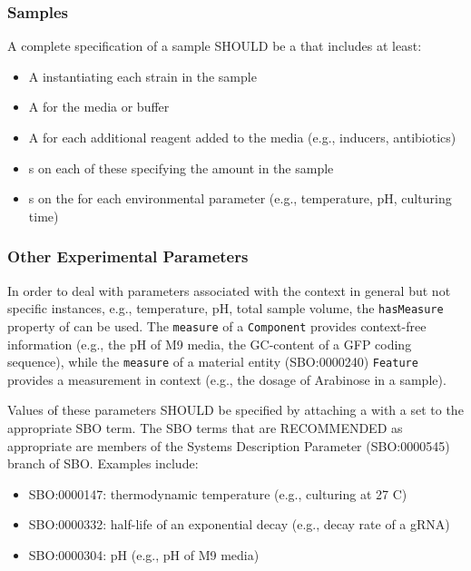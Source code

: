 \subsubsection{Samples}

A complete specification of a sample SHOULD be a  that includes at least:
\begin{itemize}
\item A  instantiating each strain in the sample
\item A  for the media or buffer
\item A  for each additional reagent added to the media (e.g., inducers, antibiotics)
\item {}s on each of these specifying the amount in the sample
\item {}s on the  for each environmental parameter (e.g., temperature, pH, culturing time)
\end{itemize}

\subsubsection{Other Experimental Parameters}

In order to deal with parameters associated with the context in general but not specific instances, e.g., temperature, pH, total sample volume, the \texttt{hasMeasure} property of  can be used.  The \texttt{measure} of a \texttt{Component} provides context-free information (e.g., the pH of M9 media, the GC-content of a GFP coding sequence), while the \texttt{measure} of a material entity (SBO:0000240) \texttt{Feature} provides a measurement in context (e.g., the dosage of Arabinose in a sample).

Values of these parameters SHOULD be specified by attaching a  with a  set to the appropriate SBO term. The SBO terms that are RECOMMENDED as appropriate are members of the Systems Description Parameter (SBO:0000545) branch of SBO. Examples include:
\begin{itemize}
\item SBO:0000147: thermodynamic temperature (e.g., culturing at 27 C)
\item SBO:0000332: half-life of an exponential decay (e.g., decay rate of a gRNA)
\item SBO:0000304: pH (e.g., pH of M9 media)
\end{itemize}


